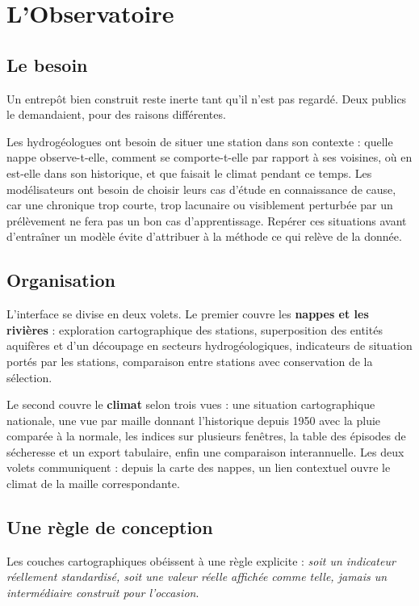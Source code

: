 \section{L'Observatoire}

\subsection{Le besoin}

Un entrepôt bien construit reste inerte tant qu'il n'est pas regardé. Deux publics le
demandaient, pour des raisons différentes.

Les hydrogéologues ont besoin de situer une station dans son contexte : quelle nappe
observe-t-elle, comment se comporte-t-elle par rapport à ses voisines, où en est-elle dans son
historique, et que faisait le climat pendant ce temps. Les modélisateurs ont besoin de choisir
leurs cas d'étude en connaissance de cause, car une chronique trop courte, trop lacunaire ou
visiblement perturbée par un prélèvement ne fera pas un bon cas d'apprentissage. Repérer ces
situations avant d'entraîner un modèle évite d'attribuer à la méthode ce qui relève de la
donnée.

\subsection{Organisation}

L'interface se divise en deux volets. Le premier couvre les \textbf{nappes et les rivières} :
exploration cartographique des stations, superposition des entités aquifères et d'un découpage
en secteurs hydrogéologiques, indicateurs de situation portés par les stations, comparaison
entre stations avec conservation de la sélection.

Le second couvre le \textbf{climat} selon trois vues : une situation cartographique nationale,
une vue par maille donnant l'historique depuis 1950 avec la pluie comparée à la normale, les
indices sur plusieurs fenêtres, la table des épisodes de sécheresse et un export tabulaire,
enfin une comparaison interannuelle. Les deux volets communiquent : depuis la carte des nappes,
un lien contextuel ouvre le climat de la maille correspondante.

\subsection{Une règle de conception}

Les couches cartographiques obéissent à une règle explicite : \emph{soit un indicateur
réellement standardisé, soit une valeur réelle affichée comme telle, jamais un intermédiaire
construit pour l'occasion}.

